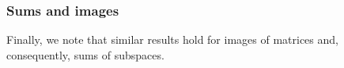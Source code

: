 \documentclass{lms}
\begin{document}
\subsubsection*{Sums and images}

Finally, we note that similar results hold for images of matrices and,
consequently, sums of subspaces.



\end{document}
